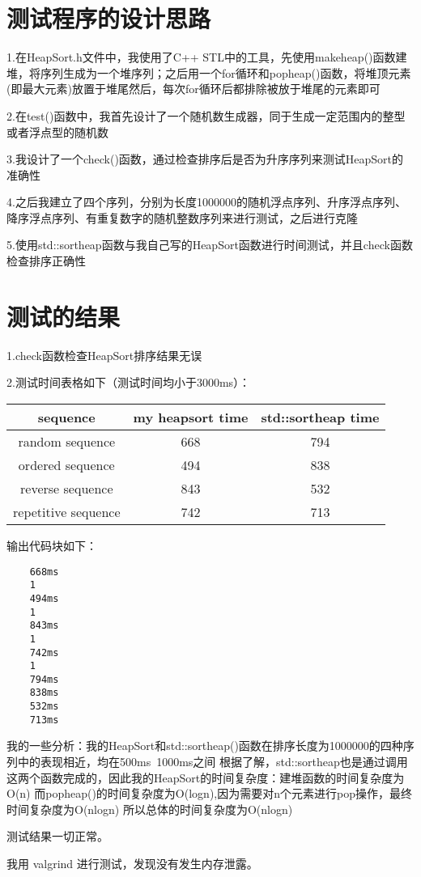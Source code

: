 \documentclass[UTF8]{ctexart}
\begin{document}
	
	\pagestyle{fancy}
	\fancyhead{}
	
	\section{测试程序的设计思路}
	
	1.在HeapSort.h文件中，我使用了C++ STL中的工具，先使用makeheap()函数建堆，将序列生成为一个堆序列；之后用一个for循环和popheap()函数，将堆顶元素(即最大元素)放置于堆尾然后，每次for循环后都排除被放于堆尾的元素即可
	
	2.在test()函数中，我首先设计了一个随机数生成器，同于生成一定范围内的整型或者浮点型的随机数
	
	3.我设计了一个check()函数，通过检查排序后是否为升序序列来测试HeapSort的准确性
	
	4.之后我建立了四个序列，分别为长度1000000的随机浮点序列、升序浮点序列、降序浮点序列、有重复数字的随机整数序列来进行测试，之后进行克隆
	
	5.使用std::sortheap函数与我自己写的HeapSort函数进行时间测试，并且check函数检查排序正确性
	\section{测试的结果}
	
	1.check函数检查HeapSort排序结果无误
	
	2.测试时间表格如下（测试时间均小于3000ms）：
	
	\begin{tabular}{|c|c|c|}
	\hline
	sequence & my heapsort time & std::sortheap time \\ \hline
	random sequence & 668 & 794 \\ \hline
	ordered sequence & 494 & 838 \\ \hline
	reverse sequence & 843 & 532 \\ \hline
	repetitive sequence & 742 & 713 \\ \hline
	
	\end{tabular}

	输出代码块如下：
	\begin{lstlisting}
	668ms
	1
	494ms
	1
	843ms
	1
	742ms
	1
	794ms
	838ms
	532ms
	713ms
	\end{lstlisting}
	
	
		
	我的一些分析：我的HeapSort和std::sortheap()函数在排序长度为1000000的四种序列中的表现相近，均在500ms~1000ms之间
	根据了解，std::sortheap也是通过调用这两个函数完成的，因此我的HeapSort的时间复杂度：建堆函数的时间复杂度为O(n)
	而popheap()的时间复杂度为O(logn),因为需要对n个元素进行pop操作，最终时间复杂度为O(nlogn) 
	所以总体的时间复杂度为O(nlogn)
	
	测试结果一切正常。
	
	我用 valgrind 进行测试，发现没有发生内存泄露。
	
	
\end{document}
